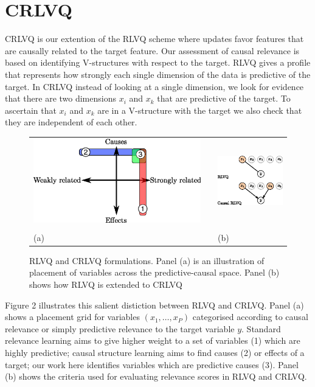 \documentclass{esannV2}
\begin{document}
\section{CRLVQ}
\label{sec:CRLVQ}

CRLVQ is our extention of the RLVQ scheme where updates favor features that are causally related to the target feature. Our assessment of causal relevance is based on identifying V-structures with respect to the target. RLVQ gives a profile that represents how strongly each single dimension of the data is predictive of the target. In CRLVQ instead of looking at a single dimension, we look for evidence that there are two dimensions $x_i$ and $x_k$ that are predictive of the target. To ascertain that $x_i$ and $x_k$ are in a V-structure with the target we also check that they are independent of each other.

\begin{figure}[!h]
\begin{tabular}{m{}cm{}}
\includegraphics[width=.5\textwidth]{causal-relevance-dimensions.eps} & &
\includegraphics[width=.4\textwidth]{rlvq-crlvq.eps} \\
& \\
(a) & & (b)  
\end{tabular}
\label{fig:causes}
\caption{RLVQ and CRLVQ formulations. Panel (a) is an illustration of placement of variables across the predictive-causal space. Panel (b) shows how RLVQ is extended to CRLVQ}
\end{figure}

Figure 2 illustrates this salient distiction between RLVQ and CRLVQ. Panel (a) shows a placement grid for variables $(x_1, \ldots, x_P)$ categorised according to causal relevance or simply predictive relevance to the target variable $y$. Standard relevance learning aims to give higher weight to a set of variables (1) which are highly predictive; causal structure learning aims to find causes (2) or effects of a target; our work here identifies variables which are predictive causes (3). Panel (b) shows the criteria used for evaluating relevance scores in RLVQ and CRLVQ.
 
\end{document}
